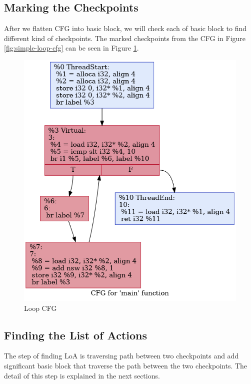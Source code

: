 \subsection{Marking the Checkpoints}


After we flatten CFG into basic block, we will check each of basic block to find different kind of checkpoints. The marked checkpoints from the CFG in Figure \ref{fig:simple-loop-cfg} can be seen in Figure \ref{fig:simple-loop-checkpoints}.

\begin{figure}[htbp]
\centerline{\includegraphics[scale=.5]{Figures/04/simple-loop-checkpoints.png}}
\caption{Loop CFG}
\label{fig:simple-loop-checkpoints}
\end{figure}

\subsection{Finding the List of Actions}

The step of finding LoA is traversing path between two checkpoints and add significant basic block that traverse the path between the two checkpoints. The detail of this step is explained in the next sections.

